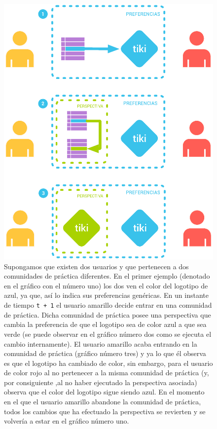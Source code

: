 \begin{figure}
\centering
\includegraphics[width=.9\linewidth]{../graphics/fig_explicacion_perspectivas.eps}
\caption{Supongamos que existen dos usuarios y que pertenecen a dos comunidades de práctica diferentes. En el primer ejemplo (denotado en el gráfico con el número uno) los dos ven el color del logotipo de \tiki{} azul, ya que, así lo indica sus preferencias genéricas. En un instante de tiempo \texttt{t + 1} el usuario amarillo decide entrar en una comunidad de práctica. Dicha comunidad de práctica posee una perspectiva que cambia la preferencia de que el logotipo sea de color azul a que sea verde (se puede observar en el gráfico número dos como se ejecuta el cambio internamente). El usuario amarillo acaba entrando en la comunidad de práctica (gráfico número tres) y ya lo que él observa es que el logotipo ha cambiado de color, sin embargo, para el usuario de color rojo al no pertenecer a la misma comunidad de práctica (y, por consiguiente ,al no haber ejecutado la perspectiva asociada) observa que el color del logotipo sigue siendo azul. En el momento en el que el usuario amarillo abandone la comunidad de práctica, todos los cambios que ha efectuado la perspectiva se revierten y se volvería a estar en el gráfico número uno.}\label{fig:explicacion_perspectivas}
\end{figure}

